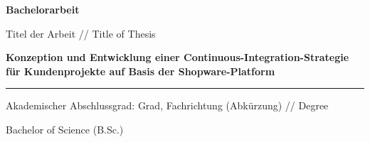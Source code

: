 
\begin{titlepage}
        \vspace{1.3cm}

        \begingroup
        \fontsize{44pt}{46pt}\selectfont
        {\bfseries Bachelorarbeit}
        \endgroup

        \vskip 1.44cm

        \begingroup
        \fontsize{8pt}{6pt}\selectfont
        Titel der Arbeit // Title of Thesis
        \endgroup

        \begingroup
        \fontsize{12pt}{14pt}\selectfont
        {\bfseries Konzeption und Entwicklung einer Continuous-Integration-Strategie für Kundenprojekte auf Basis der
        Shopware-Platform\par}
        \endgroup
        \vskip -0.1cm

        \noindent\rule{14.4cm}{0.4pt}

        \vskip 0.05cm

        \begingroup
        \fontsize{8pt}{6pt}\selectfont
        Akademischer Abschlussgrad: Grad, Fachrichtung (Abkürzung) // Degree
        \endgroup

        \vskip -0.05cm

        \begingroup
        \fontsize{12pt}{14pt}\selectfont
        Bachelor of Science (B.Sc.)
        \endgroup
        \vskip -0.1cm


\end{titlepage}
